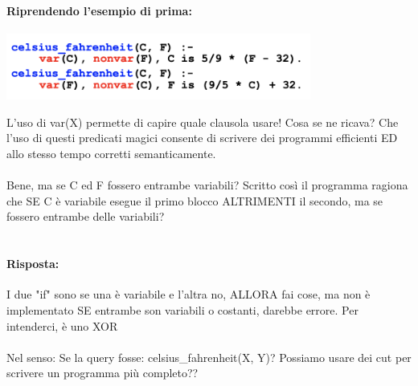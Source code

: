 \documentclass[12pt, a4paper, openany, oneside]{book}
\begin{document}
\paragraph{Riprendendo l'esempio di prima:}
\begin{center}
\includegraphics[width=0.75\textwidth]{6}
\end{center}
L'uso di var(X) permette di capire quale clausola usare! Cosa se ne ricava? Che
l'uso di questi predicati magici consente di scrivere dei programmi efficienti 
ED allo stesso tempo corretti semanticamente. \\ \\
Bene, ma se C ed F fossero entrambe variabili? Scritto così il programma ragiona
che SE C è variabile esegue il primo blocco ALTRIMENTI il secondo, ma se fossero
entrambe delle variabili? \\ \\ 
\paragraph{Risposta: } I due "if" sono se una è variabile e l'altra no, ALLORA 
fai cose, ma non è implementato SE entrambe son variabili o costanti, darebbe
errore. Per intenderci, è uno XOR\\ \\
Nel senso: Se la query fosse: celsius\_fahrenheit(X, Y)? Possiamo usare dei cut
per scrivere un programma più completo??
\end{document}
